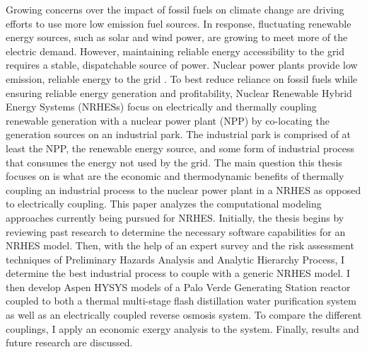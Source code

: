 \documentclass[12pt]{UIdahoMastersThesis}
\begin{document}
Growing concerns over the impact of fossil fuels on climate change are driving efforts to use more low emission fuel sources. In response, fluctuating renewable energy sources, such as solar and wind power, are growing to meet more of the electric demand. However, maintaining reliable energy accessibility to the grid requires a stable, dispatchable source of power. Nuclear power plants provide low emission, reliable energy to the grid \cite{IPCC}. To best reduce reliance on fossil fuels while ensuring reliable energy generation and profitability, Nuclear Renewable Hybrid Energy Systems (NRHESs) focus on electrically and thermally coupling renewable generation with a nuclear power plant (NPP) by co-locating the generation sources on an industrial park. The industrial park is comprised of at least the NPP, the renewable energy source, and some form of industrial process that consumes the energy not used by the grid. The main question this thesis focuses on is what are the economic and thermodynamic benefits of thermally coupling an industrial process to the nuclear power plant in a NRHES as opposed to electrically coupling. This paper analyzes the computational modeling approaches currently being pursued for NRHES. Initially, the thesis begins by reviewing past research to determine the necessary software capabilities for an NRHES model. Then, with the help of an expert survey and the risk assessment techniques of Preliminary Hazards Analysis and Analytic Hierarchy Process, I determine the best industrial process to couple with a generic NRHES model.  I then develop Aspen HYSYS models of a Palo Verde Generating Station reactor coupled to both a thermal multi-stage flash distillation water purification system as well as an electrically coupled reverse osmosis system. To compare the different couplings, I apply an economic exergy analysis to the system. Finally, results and future research are discussed.

\newpage
\end{document}
